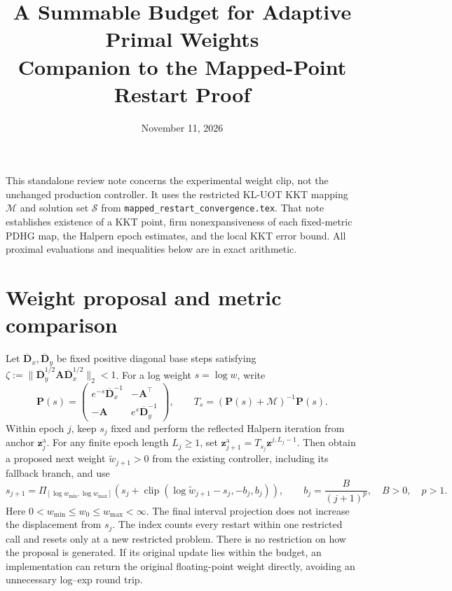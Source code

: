 \documentclass[11pt]{article}
\title{A Summable Budget for Adaptive Primal Weights\\\large Companion to the Mapped-Point Restart Proof}
\author{}
\date{November 11, 2026}
\begin{document}
\maketitle

This standalone review note concerns the experimental weight clip, not the unchanged production controller.
It uses the restricted KL-UOT KKT mapping $\mathcal M$ and solution set $\mathcal S$ from \texttt{mapped\_restart\_convergence.tex}.
That note establishes existence of a KKT point, firm nonexpansiveness of each fixed-metric PDHG map, the Halpern epoch estimates, and the local KKT error bound.
All proximal evaluations and inequalities below are in exact arithmetic.

\section{Weight proposal and metric comparison}

Let $\overline{\mathbf D}_x,\overline{\mathbf D}_y$ be fixed positive diagonal base steps satisfying $\zeta:=\|\overline{\mathbf D}_y^{1/2}\mathbf A\overline{\mathbf D}_x^{1/2}\|_2<1$.
For a log weight $s=\log w$, write
\begin{equation}
\mathbf P(s)=\begin{pmatrix}e^{-s}\overline{\mathbf D}_x^{-1}&-\mathbf A^\top\\-\mathbf A&e^s\overline{\mathbf D}_y^{-1}\end{pmatrix},\qquad T_s=(\mathbf P(s)+\mathcal M)^{-1}\mathbf P(s).
\end{equation}
Within epoch $j$, keep $s_j$ fixed and perform the reflected Halpern iteration from anchor $\mathbf z_j^{\mathrm a}$.
For any finite epoch length $L_j\geq1$, set $\mathbf z_{j+1}^{\mathrm a}=T_{s_j}\mathbf z^{j,L_j-1}$.
Then obtain a proposed next weight $\widetilde w_{j+1}>0$ from the existing controller, including its fallback branch, and use
\begin{equation}
s_{j+1}=\Pi_{[\log w_{\min},\log w_{\max}]}\!\left(s_j+\operatorname{clip}(\log\widetilde w_{j+1}-s_j,-b_j,b_j)\right),\qquad b_j=\frac{B}{(j+1)^p},\quad B>0,\quad p>1.
\label{eq:clip}
\end{equation}
Here $0<w_{\min}\leq w_0\leq w_{\max}<\infty$.
The final interval projection does not increase the displacement from $s_j$.
The index counts every restart within one restricted call and resets only at a new restricted problem.
There is no restriction on how the proposal is generated.
If its original update lies within the budget, an implementation can return the original floating-point weight directly, avoiding an unnecessary log--exp round trip.
\end{document}
